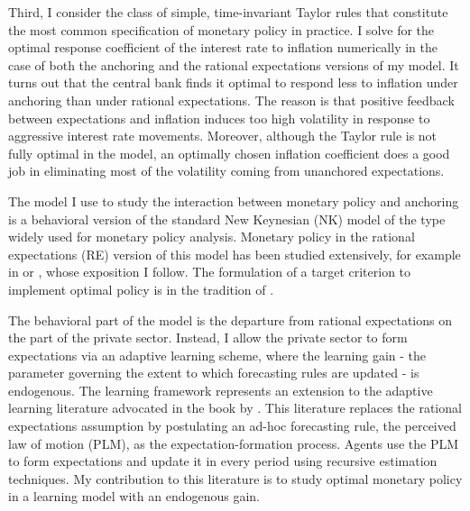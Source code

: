 \documentclass[11pt]{article}
\renewcommand{\[}{\begin{equation}}
\renewcommand{\]}{\end{equation}}
\begin{document}
Third, I consider the class of simple, time-invariant Taylor rules that constitute the most common specification of monetary policy in practice. I solve for the optimal response coefficient of the interest rate to inflation numerically in the case of both the anchoring and the rational expectations versions of my model. It turns out that the central bank finds it optimal to respond less to inflation under anchoring than under rational expectations. The reason is that positive feedback between expectations and inflation induces too high volatility in response to aggressive interest rate movements. Moreover, although the Taylor rule is not fully optimal in the model, an optimally chosen inflation coefficient does a good job in eliminating most of the volatility coming from unanchored expectations.



The model I use to study the interaction between monetary policy and anchoring is a behavioral version of the standard New Keynesian (NK) model of the type widely used for monetary policy analysis. Monetary policy in the rational expectations (RE) version of this model has been studied extensively, for example in \cite{clarida1999science} or \cite{woodford2011interest}, whose exposition I follow. The formulation of a target criterion to implement optimal policy is in the tradition of \cite{svensson1999inflation}.

The behavioral part of the model is the departure from rational expectations on the part of the private sector. Instead, I allow the private sector to form expectations via an adaptive learning scheme, where the learning gain - the parameter governing the extent to which forecasting rules are updated - is endogenous. The learning framework represents an extension to the adaptive learning literature advocated in the book by \cite{evans_honkapohja2001}. This literature replaces the rational expectations assumption by postulating an ad-hoc forecasting rule, the perceived law of motion (PLM), as the expectation-formation process. Agents use the PLM to form expectations and update it in every period using recursive estimation techniques. My contribution to this literature is to study optimal monetary policy in a learning model with an endogenous gain.
\end{document}
